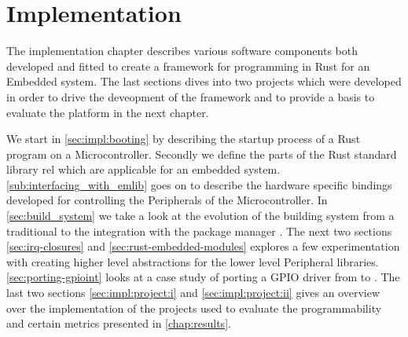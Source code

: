 \chapter{Implementation}
\label{chap:impl}

The implementation chapter describes various software components both developed and fitted to create a framework for programming in Rust for an Embedded system.
The last sections dives into two projects which were developed in order to drive the deveopment of the framework and to provide a basis to evaluate the platform in the next chapter.

We start in \autoref{sec:impl:booting} by describing the startup process of a Rust program on a Microcontroller.
Secondly we define the parts of the Rust standard library \gls{rel} which are applicable for an embedded system.
\autoref{sub:interfacing_with_emlib} goes on to describe the hardware specific bindings developed for controlling the Peripherals of the Microcontroller.
In \autoref{sec:build_system} we take a look at the evolution of the building system from a traditional  to the integration with the {\rust} package manager {\cargo}.
The next two sections \autoref{sec:irq-closures} and \autoref{sec:rust-embedded-modules} explores a few experimentation with creating higher level abstractions for the lower level Peripheral libraries.
\autoref{sec:porting-gpioint} looks at a case study of porting a GPIO driver from {\C} to {\rust}.
The last two sections \autoref{sec:impl:project:i} and \autoref{sec:impl:project:ii} gives an overview over the implementation of the projects used to evaluate the programmability and certain metrics presented in \autoref{chap:results}.












